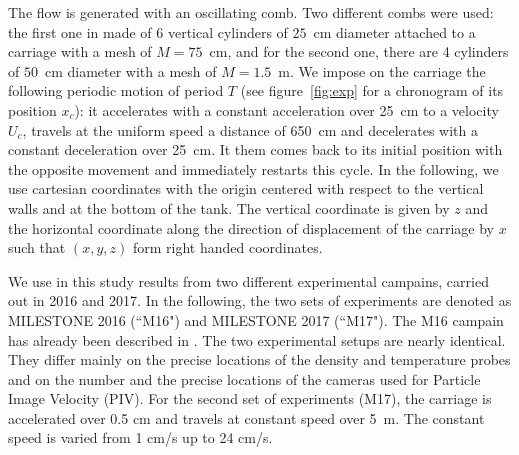 The flow is generated with an oscillating comb. Two different combs were used:
the first one in made of 6 vertical cylinders of $25$~cm diameter attached to a
carriage with a mesh of $M=75$~cm, and for the second one, there are 4
cylinders of $50$~cm diameter with a mesh of $M=1.5$~m. We impose on the
carriage the following periodic motion of period $T$ (see figure~\ref{fig:exp}
for a chronogram of its position $x_c$): it accelerates with a constant
acceleration over 25~cm to a velocity $U_c$, travels at the uniform speed a
distance of 650~cm and decelerates with a constant deceleration over 25~cm. It
them comes back to its initial position with the opposite movement and
immediately restarts this cycle. In the following, we use cartesian coordinates
with the origin centered with respect to the vertical walls and at the bottom
of the tank. The vertical coordinate is given by $z$ and the horizontal
coordinate along the direction of displacement of the carriage by $x$ such that
$(x,y,z)$ form right handed coordinates.

We use in this study results from two different experimental campains, carried
out in 2016 and 2017. In the following, the two sets of experiments are denoted
as MILESTONE 2016 (``M16") and MILESTONE 2017 (``M17"). The M16 campain has
already been described in \cite{campagne2016}. The two experimental setups are
nearly identical. They differ mainly on the precise locations of the density
and temperature probes and on the number and the precise locations of the
cameras used for Particle Image Velocity (PIV). For the second set of
experiments (M17), the carriage is accelerated over 0.5 cm and travels at
constant speed over 5~m. The constant speed is varied from 1 cm/s up to 24
cm/s.

